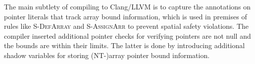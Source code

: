 
The main subtlety of compiling \checkedc to Clang/LLVM is to capture the annotations on pointer literals
that track array bound information, which is used in premises
of rules like \textsc{S-DefArray} and
  \textsc{S-AssignArr} to prevent spatial safety violations.
The \checkedc compiler \cite{li22checkedc} inserted additional pointer checks 
for verifying pointers are not null and the bounds are within their limits. 
The latter is done by introducing additional shadow variables for storing (NT-)array pointer bound information.

